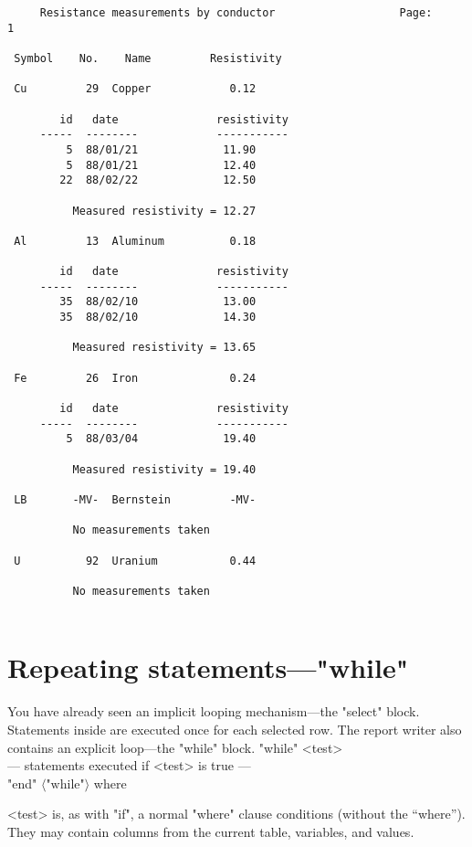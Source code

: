 \documentclass[11pt,a4paper]{report}
\def\opt#1{$\langle \mbox{#1} \rangle$}
\def\I{\index}
\begin{document}
\Rimdisp
\begin{verbatim}
     Resistance measurements by conductor                   Page:     1
 
 Symbol    No.    Name         Resistivity
 
 Cu         29  Copper            0.12
 
        id   date               resistivity
     -----  --------            -----------
         5  88/01/21             11.90
         5  88/01/21             12.40
        22  88/02/22             12.50
 
          Measured resistivity = 12.27
 
 Al         13  Aluminum          0.18
 
        id   date               resistivity
     -----  --------            -----------
        35  88/02/10             13.00
        35  88/02/10             14.30
 
          Measured resistivity = 13.65
 
 Fe         26  Iron              0.24
 
        id   date               resistivity
     -----  --------            -----------
         5  88/03/04             19.40
 
          Measured resistivity = 19.40
 
 LB       -MV-  Bernstein         -MV-
 
          No measurements taken
 
 U          92  Uranium           0.44
 
          No measurements taken
 
\end{verbatim}
\enddisp
 
\section{Repeating statements---"while"}
%
\I{while statement}
\I{looping}
You have already seen an implicit looping mechanism---the "select"
block.  Statements inside are executed once for each selected row.
The report writer also contains an explicit loop---the "while" block.
"while" <test>\\
  --- statements executed if <test> is true ---\\
  "end" \opt{"while"}
where
\begin{List}
\item[<test>] is, as with "if", a normal
"where" clause conditions (without the
``where'').  They may contain columns from the current table,
variables, and values.
\end{List}
 
\end{document}
